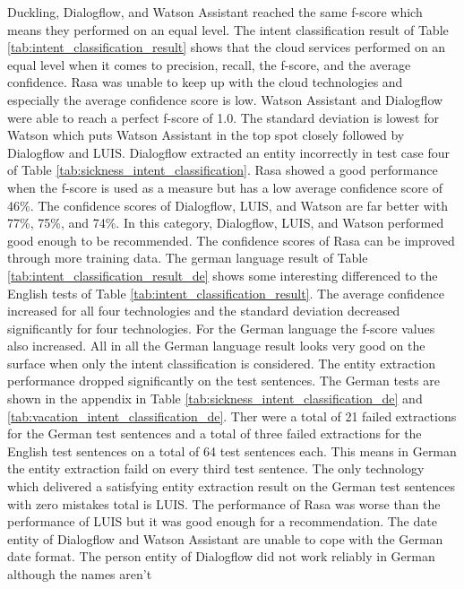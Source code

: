 Duckling, Dialogflow, and Watson Assistant reached the same f-score which means they 
performed on an equal level.
The intent classification result of Table \ref{tab:intent_classification_result}
shows that the cloud services performed on an equal level when it comes to 
precision, recall, the f-score, and the average confidence.
Rasa was unable to keep up with the cloud technologies and especially the average 
confidence score is low.
Watson Assistant and Dialogflow were able to reach a perfect f-score of 1.0.
The standard deviation is lowest for Watson which puts Watson Assistant in the top 
spot closely followed by Dialogflow and LUIS.
Dialogflow extracted an entity incorrectly 
in test case four of Table \ref{tab:sickness_intent_classification}.
Rasa showed a good performance when the f-score is used as a measure but 
has a low average confidence score of 46\%.
The confidence scores of Dialogflow, LUIS, and Watson are far better with 77\%, 75\%, and 74\%.
In this category, Dialogflow, LUIS, and Watson performed good enough to be recommended.
The confidence scores of Rasa can be improved through more training data.
The german language result of Table \ref{tab:intent_classification_result_de} shows some interesting 
differenced to the English tests of Table \ref{tab:intent_classification_result}.
The average confidence increased for all four technologies and the standard deviation 
decreased significantly for four technologies.
For the German language the f-score values also increased.
All in all the German language result looks very good on the surface when only the intent 
classification is considered.
The entity extraction performance dropped significantly on the test sentences.
The German tests are shown in the appendix in Table \ref{tab:sickness_intent_classification_de} and \ref{tab:vacation_intent_classification_de}.
Ther were a total of 21 failed extractions for the German test sentences and a total of three failed 
extractions for the English test sentences on a total of 64 test sentences each.
This means in German the entity extraction faild on every third test sentence.
The only technology which delivered a satisfying entity extraction result on the German 
test sentences with zero mistakes total is LUIS.
The performance of Rasa was worse than the performance of LUIS but it was good enough
for a recommendation.
The date entity of Dialogflow and Watson Assistant are unable to cope with the German date format.
The person entity of Dialogflow did not work reliably in German although the names aren't 

